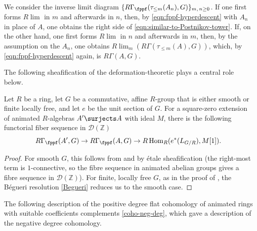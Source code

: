 \bpf
We consider the inverse limit diagram $\{ R\Gamma_\fppf(\tau_{\le m}(A_n), G) \}_{m,\, n \ge 0}$. If one first forms $R\lim$ in $m$ and afterwards in $n$, then, by \eqref{eqn:fppf-hyperdescent} with $A_n$ in place of $A$, one obtains the right side of \eqref{eqn:similar-to-Postnikov-tower}. If, on the other hand, one first forms $R\lim$ in $n$ and afterwards in $m$, then, by the assumption on the $A_n$, one obtains $R\lim_m(R\Gamma(\tau_{\le m}(A), G))$, which, by \eqref{eqn:fppf-hyperdescent} again, is $R\Gamma(A, G)$.
\epf



The following sheafification of the deformation-theoretic  plays a central role below.

\bthm \label{prop:defthy}
Let $R$ be a ring, let $G$ be a commutative, affine $R$-group that is either smooth or finite locally free, and let $e$ be the unit section of $G$. For a square-zero extension of animated $R$-algebras $A'\surjects A$ with ideal $M$, there is the following functorial fiber sequence in $\mathcal D(\mathbb Z)$\ucolon
\[
R\Gamma_\fppf(A',G)\to R\Gamma_\fppf(A,G)\to R\Hom_R(e^*(L_{G/R}), M[1]).
\]
\ethm

\begin{proof}
For smooth $G$, this follows from  and  by \'etale sheafification (the right-most term is $1$-connective, so the fibre sequence in animated abelian groups gives a fibre sequence in $\mathcal D(\mathbb Z)$). For finite, locally free $G$, as in the proof of , the B\'{e}gueri resolution \eqref{Begueri}
reduces us to the smooth case.
\end{proof}



The following description of the positive degree flat cohomology of animated rings with suitable coefficients complements \eqref{coho-neg-deg}, which gave a description of the negative degree cohomology.


